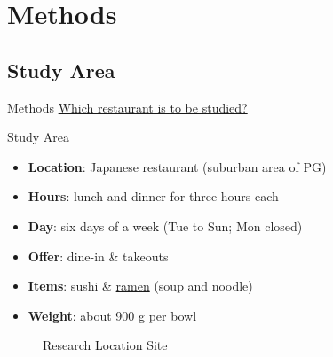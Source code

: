 \documentclass{beamer}\usepackage[]{graphicx}\usepackage[]{xcolor}
\begin{document}
\section{Methods}
\subsection{Study Area}
\begin{frame}{Methods}
    \underline{Which restaurant is to be studied?}
    \begin{block}{Study Area}
        \begin{itemize}
            \item \textbf{Location}: Japanese restaurant (suburban area of PG)
            \item \textbf{Hours}: lunch and dinner for three hours each
            \item \textbf{Day}: six days of a week (Tue to Sun; Mon closed)
            \item \textbf{Offer}: dine-in \& takeouts
            \item \textbf{Items}: sushi \& \underline{ramen} (soup and noodle)
            \item \textbf{Weight}: about 900 g per bowl
        \end{itemize}
    \end{block}
    
        \begin{figure}
            \centering
            \qquad
            \caption{Research Location Site}
        \end{figure}
\end{frame}

\end{document}
